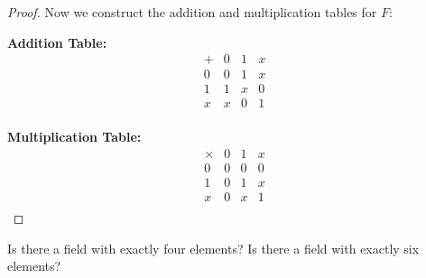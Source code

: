 \documentclass[
	12pt, %
	fleqn, %
	a4paper, %
]{LegrandOrangeBook}
\begin{document}
\begin{proof}
        Now we construct the addition and multiplication tables for \( F \):

        \noindent
        \begin{minipage}{.5\textwidth}
        \centering
        \textbf{Addition Table:}
        \[
        \begin{array}{c|ccc}
        + & 0 & 1 & x \\
        \hline
        0 & 0 & 1 & x \\
        1 & 1 & x & 0 \\
        x & x & 0 & 1 \\
        \end{array}
        \]
        \end{minipage}%
        \begin{minipage}{.5\textwidth}
        \centering
        \textbf{Multiplication Table:}
        \[
        \begin{array}{c|ccc}
        \times & 0 & 1 & x \\
        \hline
        0 & 0 & 0 & 0 \\
        1 & 0 & 1 & x \\
        x & 0 & x & 1 \\
        \end{array}
        \]
        \end{minipage}
        \end{proof}
\begin{problem}
    Is there a field with exactly four elements? Is there a field with exactly six elements?
\end{problem}
\end{document}
